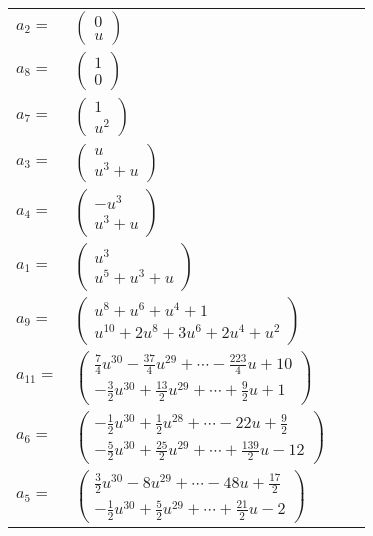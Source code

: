 \documentclass[1p]{elsarticle_modified}
\theoremstyle{definition}
\begin{document}
\begin{tabular}{m{7pt} m{180pt} m{7pt} m{180pt} }
\flushright $a_{2}=$&$\begin{pmatrix}0\\u\end{pmatrix}$ \\
\flushright $a_{8}=$&$\begin{pmatrix}1\\0\end{pmatrix}$ \\
\flushright $a_{7}=$&$\begin{pmatrix}1\\u^2\end{pmatrix}$ \\
\flushright $a_{3}=$&$\begin{pmatrix}u\\u^3+u\end{pmatrix}$ \\
\flushright $a_{4}=$&$\begin{pmatrix}- u^3\\u^3+u\end{pmatrix}$ \\
\flushright $a_{1}=$&$\begin{pmatrix}u^3\\u^5+u^3+u\end{pmatrix}$ \\
\flushright $a_{9}=$&$\begin{pmatrix}u^8+u^6+u^4+1\\u^{10}+2 u^8+3 u^6+2 u^4+u^2\end{pmatrix}$ \\
\flushright $a_{11}=$&$\begin{pmatrix}\frac{7}{4} u^{30}-\frac{37}{4} u^{29}+\cdots-\frac{223}{4} u+10\\-\frac{3}{2} u^{30}+\frac{13}{2} u^{29}+\cdots+\frac{9}{2} u+1\end{pmatrix}$ \\
\flushright $a_{6}=$&$\begin{pmatrix}-\frac{1}{2} u^{30}+\frac{1}{2} u^{28}+\cdots-22 u+\frac{9}{2}\\-\frac{5}{2} u^{30}+\frac{25}{2} u^{29}+\cdots+\frac{139}{2} u-12\end{pmatrix}$ \\
\flushright $a_{5}=$&$\begin{pmatrix}\frac{3}{2} u^{30}-8 u^{29}+\cdots-48 u+\frac{17}{2}\\-\frac{1}{2} u^{30}+\frac{5}{2} u^{29}+\cdots+\frac{21}{2} u-2\end{pmatrix}$ \\

\end{tabular}
\end{document}
